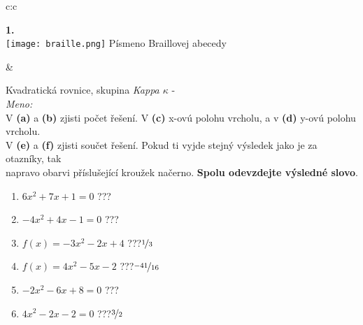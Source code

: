 \documentclass[10pt]{report}
\begin{document}
\begin{tabular}{c:c}
\begin{minipage}[c][99mm][t]{0.49\linewidth}
\begin{center}
\begin{minipage}{0.20\linewidth}
\begin{center}
{\Huge\bfseries 1.} \\[2mm]
\texttt{[image: braille.png]}
{\small Písmeno Braillovej abecedy}
\end{center}
\end{minipage}
\end{center}
\end{minipage}
&
\begin{minipage}[c][99mm][t]{0.49\linewidth}
\begin{center}
\vspace{7mm}
{\huge Kvadratická rovnice, skupina \textit{Kappa $\kappa$} -}\\[4.5mm]
\textit{Meno:}\phantom{xxxxxxxxxxxxxxxxxxxxxxxxxxxxxxxxxxxxxxxxxxxxxxxxxxxxxxxxxxxxxxxxx}\\[3.5mm]
V \textbf{(a)} a \textbf{(b)} zjisti počet řešení. V \textbf{(c)} x-ovú polohu vrcholu, a v \textbf{(d)} y-ovú polohu vrcholu.\\V \textbf{(e)} a \textbf{(f)} zjisti součet řešení. Pokud ti vyjde stejný výsledek jako je za otazníky, tak\\napravo obarvi příslušející kroužek načerno. \textbf{Spolu odevzdejte výsledné slovo}.\\[3mm]
\begin{minipage}{0.77\linewidth}
\begin{center}
\begin{varwidth}{\textwidth}
\begin{enumerate}
\large
\item $6x^2+7x+1=0$\quad \dotfill\; ???\;\dotfill {}
\item $-4x^2+4x-1=0$\quad \dotfill\; ???\;\dotfill {}
\item $f(x)=-3x^2-2x+4$\quad \dotfill\; ???\;\dotfill \quad $\nicefrac{1}{3}$
\item $f(x)=4x^2-5x-2$\quad \dotfill\; ???\;\dotfill \quad $\nicefrac{-41}{16}$
\item $-2x^2-6x+8=0$\quad \dotfill\; ???\;\dotfill {}
\item $4x^2-2x-2=0$\quad \dotfill\; ???\;\dotfill \quad $\nicefrac{3}{2}$
\end{enumerate}
\end{varwidth}
\end{center}
\end{minipage}
\begin{minipage}{0.20\linewidth}

\end{minipage}
\end{center}
\end{minipage}
\end{tabular}
\end{document}
